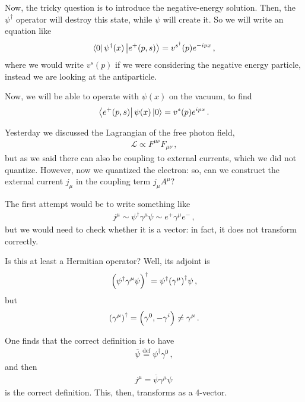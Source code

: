 \documentclass[main.tex]{subfiles}
\begin{document}
Now, the tricky question is to introduce the negative-energy solution. 
Then, the \(\psi ^\dag\) operator will destroy this state, while \(\psi \) will create it. 
So we will write an equation like 
%
\begin{align}
\bra{0} \psi ^\dag (x) \ket{e^{+} (p, s)} 
= v^{s ^\dag} (p) e^{-ipx} 
\,,
\end{align}
%
where we would write \(v^{s}(p)\) if we were considering the negative energy particle, instead we are looking at the antiparticle.

Now, we will be able to operate with \(\psi (x)\) on the vacuum, to find 
%
\begin{align}
\bra{e^{+}(p, s)} \psi (x) \ket{0} = v^{s} (p) e^{ipx}
\,.
\end{align}

Yesterday we discussed the Lagrangian of the free photon field, 
%
\begin{align}
\mathscr{L} \propto F^{\mu \nu } F_{\mu \nu }
\,,
\end{align}
%
but as we said there can also be coupling to external currents, which we did not quantize. 
However, now we quantized the electron: so, can we construct the external current \(j_{\mu }\) in the coupling term \(j_{\mu }A^{\mu }\)? 

The first attempt would be to write something like 
%
\begin{align}
j^{\mu } \sim \psi ^\dag \gamma^{\mu } \psi 
\sim e^{+} \gamma^{\mu } e^{-}
\,,
\end{align}
%
but we would need to check whether it is a vector: in fact, it does not transform correctly. 

Is this at least a Hermitian operator? Well, its adjoint is 
%
\begin{align}
\qty(\psi ^\dag \gamma^{\mu } \psi ) ^\dag = \psi ^\dag \qty(\gamma^{\mu })^\dag \psi 
\,,
\end{align}
%
but 
%
\begin{align}
\qty(\gamma^{\mu })^\dag = \qty(\gamma^{0}, - \gamma^{i}) \neq \gamma^{\mu }
\,.
\end{align}

One finds that the correct definition is to have 
%
\begin{align}
\overline{\psi} \overset{\text{def}}{=}
\psi ^\dag \gamma^{0}
\,,
\end{align}
%
and then 
%
\begin{align}
j^{\mu } = \overline{\psi} \gamma^{\mu } \psi 
\,
\end{align}
%
is the correct definition. This, then, transforms as a 4-vector. 
\end{document}
